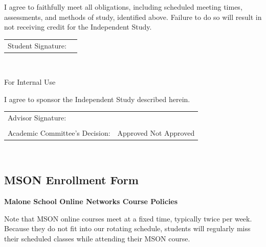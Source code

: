 I agree to faithfully meet all obligations, including scheduled meeting times, assessments, and methods of study, identified above. Failure to do so will result in not receiving credit for the Independent Study. \\

\renewcommand{\arraystretch}{1}
\noindent\begin{tabular}{ll}
Student Signature:  & \underline{\hspace{7cm}}\\

\end{tabular}\\


\vspace{.5cm}

\vfill

\noindent \hrulefill For Internal Use \hrulefill 

\vspace{.5cm}

\noindent I agree to sponsor the Independent Study described herein.\\

\renewcommand{\arraystretch}{1}
\noindent\begin{tabular}{ll}
Advisor Signature:  & \underline{\hspace{7cm}}\\
&\\
Academic Committee’s Decision:	& Approved  \hspace{.5cm} 	Not Approved
\end{tabular}\\





\newpage
\subsection{MSON Enrollment Form}

\noindent \textbf{Malone School Online Networks Course Policies}


Note that MSON online courses meet at a fixed time, typically twice per week.  Because they do not fit into our rotating schedule, students will regularly miss their scheduled classes while attending their MSON course. 

